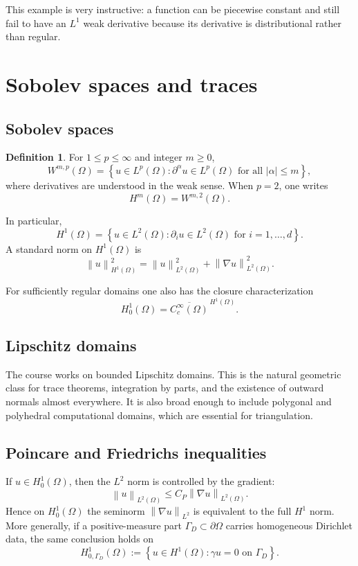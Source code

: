 \documentclass[11pt]{article}
\theoremstyle{definition}
\newtheorem{definition}[theorem]{Definition}
\newcommand{\grad}{\nabla}
\newcommand{\norm}[1]{\left\lVert #1\right\rVert}
\newcommand{\abs}[1]{\left\lvert #1\right\rvert}
\newcommand{\set}[1]{\left\{ #1\right\}}
\begin{document}
This example is very instructive: a function can be piecewise constant and still fail to have an $L^1$ weak derivative because its derivative is distributional rather than regular.

\section{Sobolev spaces and traces}

\subsection{Sobolev spaces}

\begin{definition}
For $1\le p\le \infty$ and integer $m\ge 0$,
\[
W^{m,p}(\Omega) = \set{u\in L^p(\Omega): \partial^\alpha u \in L^p(\Omega) \text{ for all } \abs{\alpha}\le m},
\]
where derivatives are understood in the weak sense. When $p=2$, one writes
\[
H^m(\Omega)=W^{m,2}(\Omega).
\]
\end{definition}

In particular,
\[
H^1(\Omega)=\set{u\in L^2(\Omega): \partial_i u\in L^2(\Omega) \text{ for } i=1,\dots,d}.
\]
A standard norm on $H^1(\Omega)$ is
\[
\norm{u}_{H^1(\Omega)}^2 = \norm{u}_{L^2(\Omega)}^2 + \norm{\grad u}_{L^2(\Omega)}^2.
\]

For sufficiently regular domains one also has the closure characterization
\[
H_0^1(\Omega) = \overline{C_c^\infty(\Omega)}^{\,H^1(\Omega)}.
\]

\subsection{Lipschitz domains}

The course works on bounded Lipschitz domains. This is the natural geometric class for trace theorems, integration by parts, and the existence of outward normals almost everywhere. It is also broad enough to include polygonal and polyhedral computational domains, which are essential for triangulation.

\subsection{Poincare and Friedrichs inequalities}

If $u\in H_0^1(\Omega)$, then the $L^2$ norm is controlled by the gradient:
\[
\norm{u}_{L^2(\Omega)} \le C_P \norm{\grad u}_{L^2(\Omega)}.
\]
Hence on $H_0^1(\Omega)$ the seminorm $\norm{\grad u}_{L^2}$ is equivalent to the full $H^1$ norm. More generally, if a positive-measure part $\Gamma_D\subset \partial\Omega$ carries homogeneous Dirichlet data, the same conclusion holds on
\[
H_{0,\Gamma_D}^1(\Omega):=\set{u\in H^1(\Omega): \gamma u=0 \text{ on } \Gamma_D}.
\]
\end{document}
